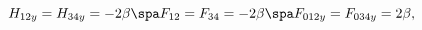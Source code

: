 \begin{equation}
\label{fluxG5IIA2}
H_{12y} = H_{34y} = - 2\beta 
\spa
F_{12} = F_{34} = - 2\beta 
\spa
F_{012y} = F_{034y} = 2\beta,
\end{equation}

